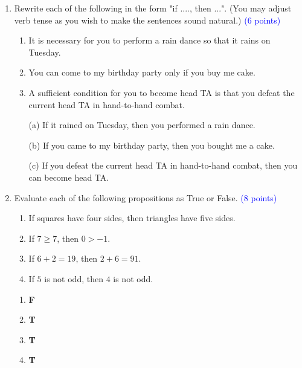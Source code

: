 \documentclass{article}
\newcommand{\pt}[1]{\textcolor{blue}{(#1 points)}}
\begin{document}
\begin{enumerate}

    \item Rewrite each of the following in the form "if ...., then ...".  (You may adjust verb tense as you wish to make the sentences sound natural.) \pt 6
    
    \begin{enumerate}
        \item It is necessary for you to perform a rain dance so that it rains on Tuesday.
        
        \item You can come to my birthday party only if you buy me cake.
        
        \item A sufficient condition for you to become head TA is that you defeat the current head TA in hand-to-hand combat.
    \end{enumerate}

    
    \begin{solution}
    \begin{enumerate}
    \item[(a)] If it rained on Tuesday, then you performed a rain dance.
    \item[(b)] If you came to my birthday party, then you bought me a cake.
    \item[(c)] If you defeat the current head TA in hand-to-hand combat, then you can become head TA.
    \end{enumerate}
    \end{solution}
    
    \item Evaluate each of the following propositions as True or False. \pt 8
    \begin{enumerate}
        \item If squares have four sides, then triangles have five sides.
        \item If $7 \geq 7$, then $0 > -1$.
        \item If $6+2 = 19$, then $2+6=91$.
        \item If $5$ is not odd, then $4$ is not odd. 
    \end{enumerate}
    
    \begin{solution}
    \begin{enumerate}
        \item \textbf{F}
        \item \textbf{T}
        \item \textbf{T}
        \item \textbf{T}
    \end{enumerate}
    \end{solution}
    

\end{enumerate}
\end{document}
